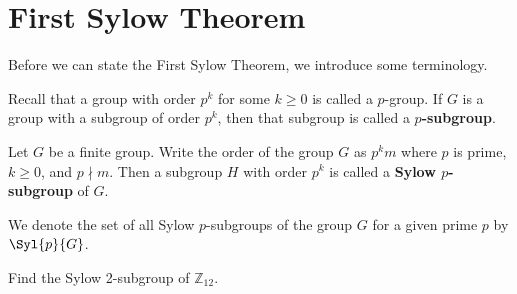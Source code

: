 \section{First Sylow Theorem}
Before we can state the First Sylow Theorem, we introduce some terminology.

Recall that a group with order $p^k$ for some $k \geq 0$ is called a $p$-group. If $G$ is a group with a subgroup of order $p^k$, then that subgroup is called a \textbf{$p$-subgroup}.
\begin{definition}\label{definition-sylow-p-subgroup}
    Let $G$ be a finite group. Write the order of the group $G$ as $p^k m$ where $p$ is prime, $k \geq 0$, and $p \nmid m$. Then a subgroup $H$ with order $p^k$ is called a \textbf{Sylow $p$-subgroup} of $G$.
\end{definition}
We denote the set of all Sylow $p$-subgroups of the group $G$ for a given prime $p$ by $\Syl{p}{G}$.

\begin{exercise}
    Find the Sylow 2-subgroup of $\mathbb{Z}_{12}$.
\end{exercise}

